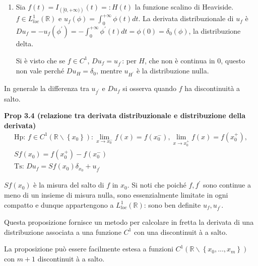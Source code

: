 \documentclass{article}
\begin{document}
\begin{enumerate}
\item Sia $f\left( t\right) =I_{\left( [0,+\infty )\right) }\left( t\right)
=:H\left( t\right) $ la funzione scalino di Heaviside. $f\in
L_{loc}^{1}\left( 
\mathbb{R}
\right) $ e $u_{f}\left( \phi \right) =\int_{0}^{+\infty }\phi \left(
t\right) dt$. La derivata distribuzionale di $u_{f}$ \`{e} $%
Du_{f}=-u_{f}\left( \phi ^{\prime }\right) =-\int_{0}^{+\infty }\phi
^{\prime }\left( t\right) dt=\phi \left( 0\right) =\delta _{0}\left( \phi
\right) $, la distribuzione delta.

Si \`{e} visto che se $f\in C^{1}$, $Du_{f}=u_{f^{\prime }}$: per $H$, che
non \`{e} continua in $0$, questo non vale perch\'{e} $Du_{H}=\delta _{0}$,
mentre $u_{H^{\prime }}$ \`{e} la distribuzione nulla.
\end{enumerate}

In generale la differenza tra $u_{f^{\prime }}$ e $Du_{f}$ si osserva quando 
$f$ ha discontinuit\`{a} a salto.

\textbf{Prop 3.4 (relazione tra derivata distribuzionale e distribuzione
della derivata)}%
\begin{gather*}
\text{Hp: }f\in C^{1}\left( 
\mathbb{R}
\backslash \left\{ x_{0}\right\} \right) :\lim_{x\rightarrow
x_{0}^{-}}f\left( x\right) =f\left( x_{0}^{-}\right) ,\lim_{x\rightarrow
x_{0}^{+}}f\left( x\right) =f\left( x_{0}^{+}\right) , \\
Sf\left( x_{0}\right) =f\left( x_{0}^{+}\right) -f\left( x_{0}^{-}\right) \\
\text{Ts: }Du_{f}=Sf\left( x_{0}\right) \delta _{x_{0}}+u_{f^{\prime }}
\end{gather*}

$Sf\left( x_{0}\right) $ \`{e} la misura del salto di $f$ in $x_{0}$. Si
noti che poich\'{e} $f,f^{\prime }$ sono continue a meno di un insieme di
misura nulla, sono essenzialmente limitate in ogni compatto e dunque
appartengono a $L_{loc}^{1}\left( 
\mathbb{R}
\right) $: sono ben definite $u_{f},u_{f^{\prime }}$.

Questa proposizione fornisce un metodo per calcolare in fretta la derivata
di una distribuzione associata a una funzione $C^{1}$ con una discontinuit%
\`{a} a salto.

La proposizione pu\`{o} essere facilmente estesa a funzioni $C^{1}\left( 
\mathbb{R}
\backslash \left\{ x_{0},...,x_{m}\right\} \right) $ con $m+1$ discontinuit%
\`{a} a salto.
\end{document}
